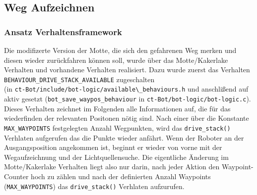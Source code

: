 \subsection{Weg Aufzeichnen}
\label{weg-aufzeichnen}

\subsubsection{Ansatz Verhaltensframework}
Die modifizerte Version der Motte, die sich den gefahrenen Weg merken und diesen
wieder zurückfahren können soll, wurde über das Motte/Kakerlake Verhalten und
vorhandene Verhalten realisiert.
Dazu wurde zuerst das Verhalten \verb+BEHAVIOUR_DRIVE_STACK_AVAILABLE+ zugeschalten \\
(in \verb+ct-Bot/include/bot-logic/available\_behaviours.h+ und anschlißend
auf aktiv gesetzt (\verb+bot_save_waypos_behaviour+ in
\verb+ct-Bot/bot-logic/bot-logic.c+). Dieses Verhalten zeichnet im Folgenden
alle Informationen auf, die für das wiederfinden der relevanten Positonen nötig sind.
Nach einer über die Konstante \verb+MAX_WAYPOINTS+ festgelegten Anzahl Wegpunkten,
wird das \verb+drive_stack()+ Verhlaten aufgerufen das die Punkte wieder anfährt.
Wenn der Roboter an der Ausgangsposition angekommen ist, beginnt er wieder von vorne mit
der Wegaufzeichnung und der Lichtquellensuche. Die eigentliche Änderung im
Motte/Kakerlake Verhalten liegt also nur darin, nach jeder Aktion den Waypoint-Counter
hoch zu zählen und nach der definierten Anzahl Waypoints (\verb+MAX_WAYPOINTS+) das
\verb+drive_stack()+ Verhlaten aufzurufen.
